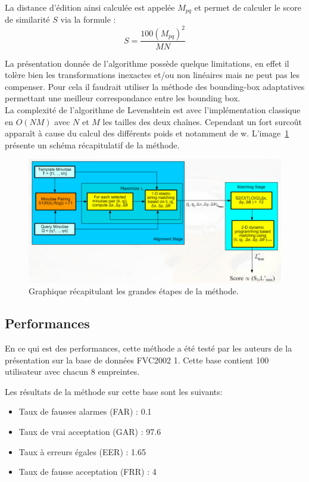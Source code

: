 \documentclass{report}
\begin{document}
La distance d'édition ainsi calculée est appelée $M_{pq}$ et permet de
calculer le score de similarité $S$ via la formule :
$$S = \frac{100 (M_{pq})^2}{MN}$$

La présentation donnée de l'algorithme possède quelque limitations, en
effet il tolère bien les transformations inexactes et/ou non linéaires
mais ne peut pas les compenser. Pour cela il faudrait utiliser la
méthode des bounding-box adaptatives permettant une meilleur
correspondance entre les bounding box.\\

La complexité de l'algorithme de Levenshtein est avec l'implémentation
classique en $O(NM)$ avec $N$ et $M$ les tailles des deux
chaînes. Cependant un fort surcoût apparaît à cause du calcul des
différents poids et notamment de w. L'image~\ref{fig:recap} présente un schéma
récapitulatif de la méthode.
\begin{figure}
  \hspace{-10em}
  \includegraphics[scale=.6]{figrecap.png}
  \caption{Graphique récapitulant les grandes étapes de la méthode.}
  \label{fig:recap}
\end{figure}

\subsection{Performances}

En ce qui est des performances, cette méthode a été testé par les
auteurs de la présentation sur la base de données FVC2002 1. Cette
base contient 100 utilisateur avec chacun 8 empreintes.

Les résultats de la méthode sur cette base sont les suivants:
\begin{itemize}
\item Taux de fausses alarmes (FAR) : 0.1%
\item Taux de vrai acceptation (GAR) : 97.6%
\item Taux à erreurs égales (EER) : 1.65%
\item Taux de fausse acceptation (FRR) : 4%
\end{itemize}
\end{document}
